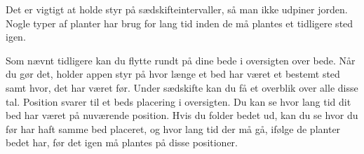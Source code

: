 \begin{minipage}{0.55\textwidth}
Det er vigtigt at holde styr på sædskifteintervaller, så man ikke udpiner jorden. Nogle typer af planter har brug for lang tid inden de må plantes et tidligere sted igen.

Som nævnt tidligere kan du flytte rundt på dine bede i oversigten over bede. Når du gør det, holder appen styr på hvor længe et bed har været et bestemt sted samt hvor, det har været før. Under sædskifte kan du få et overblik over alle disse tal. Position svarer til et beds placering i oversigten. Du kan se hvor lang tid dit bed har været på nuværende position. Hvis du folder bedet ud, kan du se hvor du før har haft samme bed placeret, og hvor lang tid der må gå, ifølge de planter bedet har, før det igen må plantes på disse positioner.
\end{minipage} 

